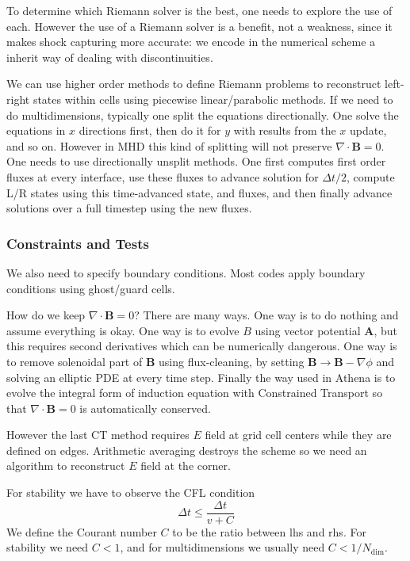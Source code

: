 \documentclass[letterpaper, 11pt]{article}
\numberwithin{equation}{section}
\numberwithin{figure}{section}
\begin{document}
To determine which Riemann solver is the best, one needs to explore the use of
each. However the use of a Riemann solver is a benefit, not a weakness, since it
makes shock capturing more accurate: we encode in the numerical scheme a inherit
way of dealing with discontinuities.

We can use higher order methods to define Riemann problems to reconstruct
left-right states within cells using piecewise linear/parabolic methods. If we
need to do multidimensions, typically one split the equations directionally. One
solve the equations in $x$ directions first, then do it for $y$ with results
from the $x$ update, and so on. However in MHD this kind of splitting will not
preserve $\nabla\cdot \mathbf{B} = 0$. One needs to use directionally unsplit
methods. One first computes first order fluxes at every interface, use these
fluxes to advance solution for $\Delta t/2$, compute L/R states using this
time-advanced state, and fluxes, and then finally advance solutions over a full
timestep using the new fluxes.

\subsubsection{Constraints and Tests}

We also need to specify boundary conditions. Most codes apply boundary
conditions using ghost/guard cells.

How do we keep $\nabla\cdot \mathbf{B} = 0$? There are many ways. One way is to
do nothing and assume everything is okay. One way is to evolve $B$ using vector
potential $\mathbf{A}$, but this requires second derivatives which can be
numerically dangerous. One way is to remove solenoidal part of $\mathbf{B}$
using flux-cleaning, by setting $\mathbf{B} \to \mathbf{B} - \nabla\phi$ and
solving an elliptic PDE at every time step. Finally the way used in Athena is to
evolve the integral form of induction equation with Constrained Transport so
that $\nabla\cdot \mathbf{B} = 0$ is automatically conserved.

However the last CT method requires $E$ field at grid cell centers while they
are defined on edges. Arithmetic averaging destroys the scheme so we need an
algorithm to reconstruct $E$ field at the corner.

For stability we have to observe the CFL condition
\begin{equation}
  \label{eq:13}
  \Delta t \leq \frac{\Delta t}{v + C}
\end{equation}
We define the Courant number $C$ to be the ratio between lhs and rhs. For
stability we need $C<1$, and for multidimensions we usually need $C <
1/N_\text{dim}$.
\end{document}
